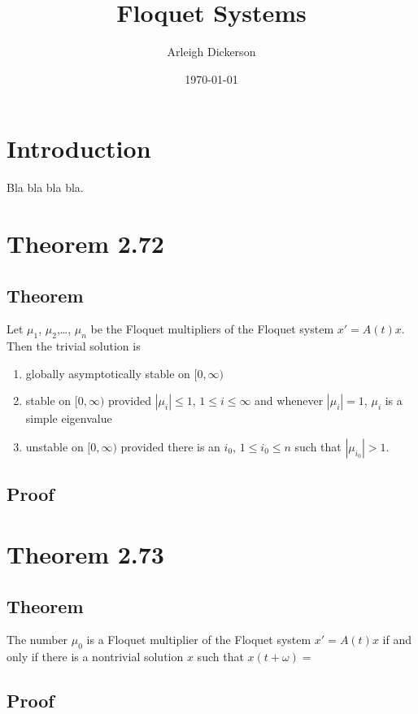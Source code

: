 \documentclass[a4paper]{article}
\title{Floquet Systems}
\author{Arleigh Dickerson}
\date{\today}
\begin{document}
\maketitle

\section{Introduction}

Bla bla bla bla.

\section{Theorem 2.72}

\subsection{Theorem}

Let $\mu_1$, $\mu_2$,\ldots, $\mu_n$ be the Floquet multipliers of the Floquet system $x' = A(t)x$. Then the trivial solution is \begin{enumerate}
    \item globally asymptotically stable on $[0,\infty)$
    \item stable on $[0,\infty)$ provided $|\mu_i| \leq 1$, $1 \leq i \leq \infty$ and whenever $|\mu_i| = 1$, $\mu_i$ is a simple eigenvalue
    \item unstable on $[0,\infty)$ provided there is an $i_0$, $1 \leq i_0 \leq n$ such that $|\mu_{i_0}| > 1$.
\end{enumerate}

\subsection{Proof}

\section{Theorem 2.73}

\subsection{Theorem}

The number $\mu_0$ is a Floquet multiplier of the Floquet system $x' = A(t)x$ if and only if there is a nontrivial solution $x$ such that $x(t + \omega) = $

\subsection{Proof}
\end{document}
